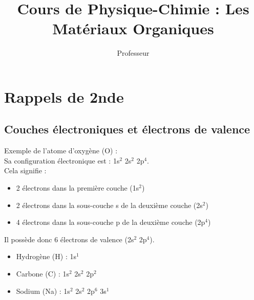 \documentclass{article}
\title{Cours de Physique-Chimie : Les Matériaux Organiques}
\author{Professeur}
\date{}
\newif\ifWITHCORRECTION
\newcommand{\corrige}[2]{\ifWITHCORRECTION #1 \else \underline{\hspace{#2}} \fi}
\begin{document}
\maketitle

\section{Rappels de 2nde}
\subsection{Couches électroniques et électrons de valence}
\begin{tcolorbox}[colback=green!10!white, colframe=green!75!black, title=Définition : ]
  \corrige{Les couches électroniques sont des niveaux d'énergie dans lesquels se répartissent les électrons autour du noyau. Les électrons de valence sont les électrons situés sur la couche externe.}{6cm}
\end{tcolorbox}

\begin{tcolorbox}[colback=blue!10!white, colframe=blue!75!black, title=Application : Structure électronique]
  Exemple de l'atome d'oxygène (O) : \\
  Sa configuration électronique est : 1s$^2$ 2s$^2$ 2p$^4$. \\
  Cela signifie :
  \begin{itemize}[noitemsep]
    \item 2 électrons dans la première couche (1s$^2$)
    \item 2 électrons dans la sous-couche s de la deuxième couche (2s$^2$)
    \item 4 électrons dans la sous-couche p de la deuxième couche (2p$^4$)
  \end{itemize}
  Il possède donc 6 électrons de valence (2s$^2$ 2p$^4$).
\end{tcolorbox}

\begin{tcolorbox}[colback=blue!10!white, colframe=blue!75!black, title=Application : Autres configurations électroniques]
  \begin{itemize}[noitemsep]
    \item Hydrogène (H) : 1s$^1$
    \item Carbone (C) : 1s$^2$ 2s$^2$ 2p$^2$
    \item Sodium (Na) : 1s$^2$ 2s$^2$ 2p$^6$ 3s$^1$
  \end{itemize}
\end{tcolorbox}
\end{document}
